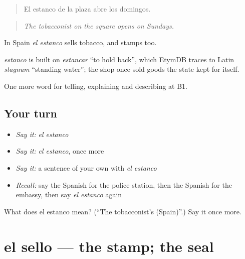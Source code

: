 \begin{quote}
El estanco de la plaza abre los domingos.
\end{quote}

\begin{quote}
\emph{The tobacconist on the square opens on Sundays.}
\end{quote}

In Spain \emph{el estanco} sells tobacco, and stamps too.

\begin{cousinweb}
\emph{estanco} is built on \emph{estancar} \textquotedblleft{}to hold back\textquotedblright{}, which EtymDB traces to Latin \emph{stagnum} \textquotedblleft{}standing water\textquotedblright{}; the shop once sold goods the state kept for itself.
\end{cousinweb}

\begin{grammarlens}[title={What you've built}]
One more word for telling, explaining and describing at B1.
\end{grammarlens}

\subsection*{Your turn}
\begin{itemize}
\raggedright
  \item \emph{Say it:} \emph{el estanco}
  \item \emph{Say it:} \emph{el estanco}, once more
  \item \emph{Say it:} a sentence of your own with \emph{el estanco}
  \item \emph{Recall:} say the Spanish for the police station, then the Spanish for the embassy, then say \emph{el estanco} again
\end{itemize}

\begin{tcolorbox}[breakable,colback=teal!4,colframe=teal!35!black,title={Before you move on}]
What does el estanco mean? (\textquotedblleft{}The tobacconist’s (Spain)\textquotedblright{}.) Say it once more.
\end{tcolorbox}
\section[el sello]{el sello — the stamp; the seal}

\label{lesson:ES-C679-sello}



